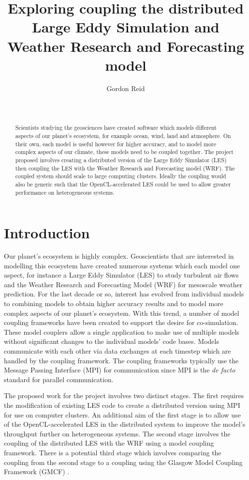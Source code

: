 \documentclass{acm_proc_article-sp}
\title{Exploring coupling the distributed Large Eddy Simulation and Weather
Research and Forecasting model}
\author{
    \alignauthor
    Gordon Reid\\
    \affaddr{School of Computing Science}\\
    \affaddr{University of Glasgow}\\
    \email{1002536r@student.gla.ac.uk}
}
\renewcommand{\_}{\underscore\hspace{0pt}}
\begin{document}
\maketitle

\begin{abstract}

Scientists studying the geosciences have created software which models different
aspects of our planet's ecosystem, for example ocean, wind, land and atmosphere.
On their own, each model is useful however for higher accuracy, and to model
more complex aspects of our climate, these models need to be coupled together.
The project proposed involves creating a distributed version of the Large Eddy
Simulator (LES) then coupling the LES with the Weather Research and Forecasting
model (WRF). The coupled system should scale to large computing clusters.
Ideally the coupling would also be generic such that the OpenCL-accelerated LES
could be used to allow greater performance on heterogeneous systems.

\end{abstract}

\section*{Introduction}

Our planet's ecosystem is highly complex. Geoscientists that are interested in
modelling this ecosystem have created numerous systems which each model one
aspect, for instance a Large Eddy Simulator (LES) to study turbulent air flows
\cite{Nakayama2011,Nakayama2012} and the Weather Research and Forecasting Model
(WRF) for mesoscale weather prediction. For the last decade or so, interest has
evolved from individual models to combining models \cite{Michalakes2010} to
obtain higher accuracy results and to model more complex aspects of our planet's
ecosystem. With this trend, a number of model coupling frameworks have been
created to support the desire for co-simulation. These model couplers allow a
single application to make use of multiple models without significant changes to
the individual models' code bases. Models communicate with each other via data
exchanges at each timestep which are handled by the coupling framework. The
coupling frameworks typically use the Message Passing Interface (MPI) for
communication since MPI is the \textit{de facto} standard for parallel
communication.

The proposed work for the project involves two distinct stages. The first
requires the modification of existing LES code to create a distributed version
using MPI for use on computer clusters. An additional aim of the first stage is
to allow use of the OpenCL-accelerated LES \cite{Vanderbauwhede2014} in the
distributed system to improve the model's throughput further on heterogeneous
systems. The second stage involves the coupling of the distributed LES with the
WRF using a model coupling framework. There is a potential third stage which
involves comparing the coupling from the second stage to a coupling using the
Glasgow Model Coupling Framework (GMCF) \cite{Vanderbauwhede2014}.
\end{document}
